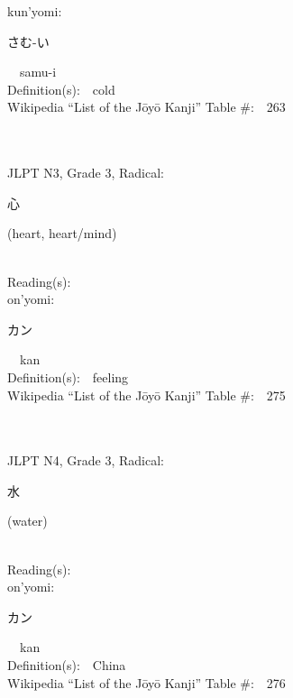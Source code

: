 \begin{multicols}{2}
{\hspace*{1em}}kun'yomi:\ \ \\
{\hspace*{2em}}{\begin{CJK}{UTF8}{min} さむ-い \end{CJK}}\ \ samu-i\ \ \\
Definition(s):\ \ cold \\
Wikipedia ``List of the J\=oy\=o Kanji'' Table \#:\ \ 263 \\
\ \ \\
{\fontsize{34pt}{40pt}  }\ \ \\  %
{JLPT N3, Grade 3, Radical:\ \ {\begin{CJK}{UTF8}{min} 心 \end{CJK}} (heart, heart/mind) } \\
Reading(s):\ \ \\
{\hspace*{1em}}on'yomi:\ \ \\
{\hspace*{2em}}{\begin{CJK}{UTF8}{min} カン \end{CJK}}\ \ kan\ \ \\
Definition(s):\ \ feeling \\
Wikipedia ``List of the J\=oy\=o Kanji'' Table \#:\ \ 275 \\
\ \ \\
{\fontsize{34pt}{40pt}  }\ \ \\  %
{JLPT N4, Grade 3, Radical:\ \ {\begin{CJK}{UTF8}{min} 水 \end{CJK}} (water) } \\
Reading(s):\ \ \\
{\hspace*{1em}}on'yomi:\ \ \\
{\hspace*{2em}}{\begin{CJK}{UTF8}{min} カン \end{CJK}}\ \ kan\ \ \\
Definition(s):\ \ China \\
Wikipedia ``List of the J\=oy\=o Kanji'' Table \#:\ \ 276 \\

\end{multicols}
